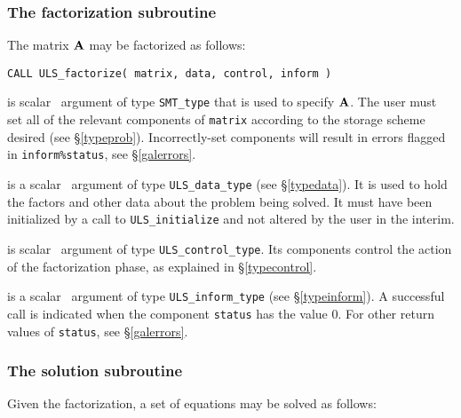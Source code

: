 \documentclass{galahad}
\newcommand{\packagename}{ULS}
\begin{document}

\subsubsection{The factorization subroutine}
The matrix ${\mathbf{A}}$ may be factorized as follows:

\hskip0.5in 
{\tt CALL \packagename\_factorize( matrix, data, control, inform )}

\begin{description}

 is scalar \intentin\ argument of type {\tt SMT\_type}  
that is used to specify ${\mathbf{A}}$.
The user must set all of the relevant components of {\tt matrix} according
to the storage scheme desired (see \S\ref{typeprob}).
Incorrectly-set components will result in errors
flagged in {\tt inform\%status}, see \S\ref{galerrors}.

  
 is a scalar \intentinout\ argument of type 
{\tt \packagename\_data\_type}
(see \S\ref{typedata}). It is used to hold the factors and other 
data about the problem being solved. 
It must have been initialized by a call to
{\tt \packagename\_ini\-tialize} and not altered by the user in the interim.

 is scalar \intentin\ argument of type 
{\tt \packagename\_control\_type}. Its components control the action
of the factorization phase, as explained in 
\S\ref{typecontrol}. 
 
 is a scalar \intentinout\ argument of type 
{\tt \packagename\_inform\_type}
(see \S\ref{typeinform}). 
A successful call is indicated when the  component {\tt status} has the value 0. 
For other return values of {\tt status}, see \S\ref{galerrors}.

\end{description}


\subsubsection{The solution subroutine}
Given the factorization, a set of equations may be solved as follows:
\end{document}
